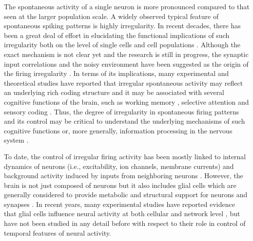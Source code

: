 \documentclass[%
 aip,
 amsmath,amssymb,
 reprint,%
]{revtex4-1}
\begin{document}
	The spontaneous activity of a single neuron is more pronounced compared to that seen at the larger population scale. A widely observed typical feature of spontaneous spiking patterns is highly irregularity. In recent decades, there has been a great deal of effort in elucidating the functional implications of such irregularity both on the level of single cells and cell populations \cite{Ozer2006, Miura2007, Ozer2009, Payne2019}. Although the exact mechanism is not clear yet and the research is still in progress, the synaptic input correlations and the noisy environment have been suggested as the origin of the firing irregularity \cite{Brunel2003, Fellous2003, Burkitt2006, Mendonca2016}. In terms of its implications, many experimental and theoretical studies have reported that irregular spontaneous activity may reflect an underlying rich coding structure and it may be associated with several cognitive functions of the brain, such as working memory \cite{Hansel2013}, selective attention \cite {Ardid2010} and sensory coding \cite {Panzer2017}. Thus, the degree of irregularity in spontaneous firing patterns and its control may be critical to understand the underlying mechanisms of such cognitive functions or, more generally, information processing in the nervous system \cite{Kim2021}.
	
	To date, the control of irregular firing activity has been mostly linked to internal dynamics of neurons (i.e., excitability, ion channels, membrane currents) and background activity induced by inputs from neighboring neurons \cite{Dipoppa2013, Peterson2017}. However, the brain is not just composed of neurons but it also includes glial cells which are generally considered to provide metabolic and structural support for neurons and synapses \cite{Barber2019, Patel2019}. In recent years, many experimental studies have reported evidence that glial cells influence neural activity at both cellular and network level \cite{Jakel 2017, Allen2018}, but have not been studied in any detail before with respect to their role in control of temporal features of neural activity.	
	
\end{document}
